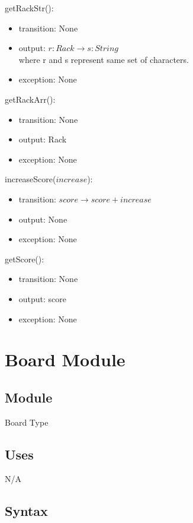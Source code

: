 \documentclass[12pt]{article}
\begin{document}
\noindent getRackStr():
\begin{itemize}
\item transition: None
\item output: $r:Rack \rightarrow s:String$ \\
where r and s represent same set of characters.
\item exception: None
\end{itemize}

\noindent getRackArr():
\begin{itemize}
\item transition: None
\item output: Rack
\item exception: None
\end{itemize}

\noindent increaseScore($increase$):
\begin{itemize}
\item transition: $score \rightarrow score+increase$
\item output: None
\item exception: None
\end{itemize}

\noindent getScore():
\begin{itemize}
\item transition: None
\item output: score
\item exception: None
\end{itemize}

\newpage

\section* {Board Module}

\subsection*{Module}

Board Type

\subsection* {Uses}

N/A

\subsection* {Syntax}
\end{document}
